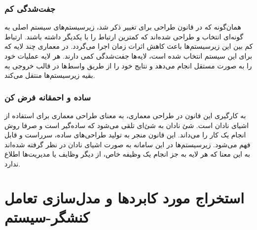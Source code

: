 \documentclass[12pt]{article}
\begin{document}
	\subsubsection{جفت‌شدگی کم}
	همان‌گونه که در قانون طراحی برای تغییر ذکر شد، زیرسیستم‌های سیستم اصلی به گونه‌ای انتخاب و طراحی شده‌اند که کمترین ارتباط را با یکدیگر داشته باشند. ارتباط کم بین این زیرسیستم‌ها باعث کاهش اثرات زمان اجرا می‌گردد.
	در معماری چند لایه که برای این سیستم انتخاب شده است، لایه‌ها جفت‌شدگی کمی دارند. هر لایه عملیات خود را به صورت مستقل انجام می‌دهد و نتایج خود را از طریق واسط‌ها در قالب خروجی به بقیه زیرسیستم‌ها منتقل می‌کند.

	\subsubsection{ساده و احمقانه فرض کن}
	به کارگیری این قانون در طراحی معماری، به معنای طراحی معماری برای استفاده از اشیای نادان است. شئ نادان به شئ‌ای تلقی می‌شود که ساده‌گیر است و صرفا روش انجام یک کار را می‌داند. این قانون منجر به تولید طراحی‌های ساده، سرراست و قابل فهم می‌شود. زیرسیستم‌ها در این سامانه به صورت اشیای نادان در نظر گرفته شده‌اند به این معنا که هر لایه به جز انجام یک وظیفه خاص، از دیگر وظایف یا مدیریت‌ها اطلاع ندارد.

	\newpage
	\section{استخراج مورد کابردها و مدل‌سازی تعامل کنشگر-سیستم}
\end{document}
